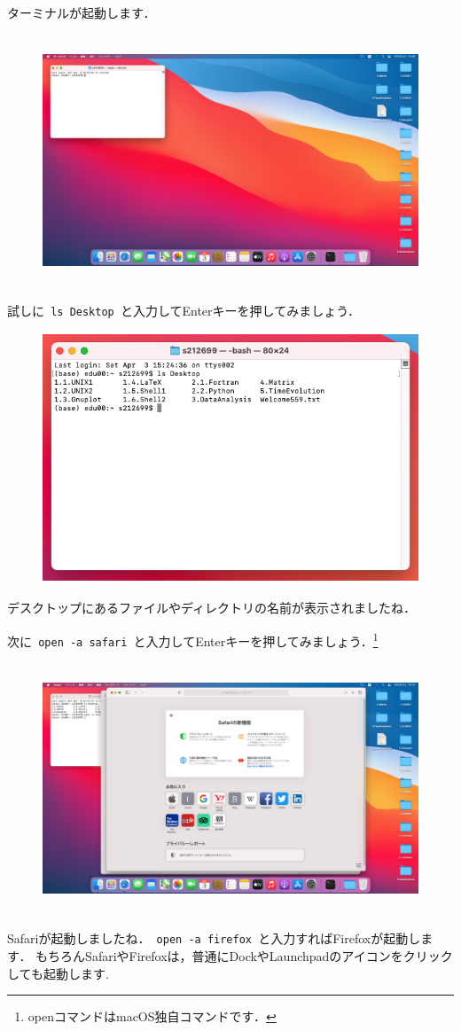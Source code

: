 \documentclass{jarticle}
\begin{document}
\newpage
ターミナルが起動します．
\begin{figure}[H]
  \centering
  \includegraphics[height=7.5cm]{fig/MacTerminal.png}
\end{figure}

試しに\verb| ls Desktop |と入力してEnterキーを押してみましょう．
\begin{figure}[H]
  \centering
  \includegraphics[height=7.5cm]{fig/MacTerminallsDesktop2.png}
\end{figure}
デスクトップにあるファイルやディレクトリの名前が表示されましたね．

\newpage
次に\verb| open -a safari |と入力してEnterキーを押してみましょう．\footnote{openコマンドはmacOS独自コマンドです．}
\begin{figure}[H]
  \centering
  \includegraphics[height=7.5cm]{fig/MacTerminalOpenSafari.png}
\end{figure}
Safariが起動しましたね．\verb| open -a firefox |と入力すればFirefoxが起動します．
もちろんSafariやFirefoxは，普通にDockやLaunchpadのアイコンをクリックしても起動します.\\
\end{document}
